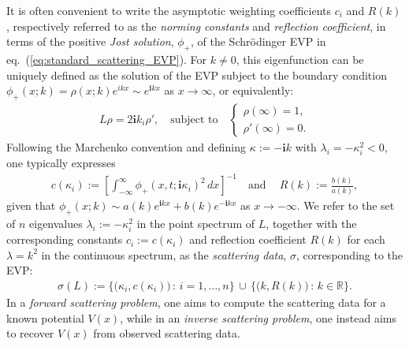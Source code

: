 \documentclass[journal=gmj]{CUP-JNL-DTM}%
\theoremstyle{definition}
\numberwithin{equation}{section}
\begin{document}
It is often convenient to write the asymptotic weighting coefficients $c_i$ and $R(k)$, respectively referred to as the \textit{norming constants} and \textit{reflection coefficient}, in terms of the positive \textit{Jost solution}, $\phi_{+}$, of the Schr\"odinger EVP in eq.~(\ref{eq:standard_scattering_EVP}). For $k \neq 0$, this eigenfunction can be uniquely defined as the solution of the EVP subject to the boundary condition $\phi_{+}(x;k) = \rho(x;k)e^{ikx} \sim e^{\boldsymbol{i}kx}$ as $x \rightarrow \infty$, or equivalently: \begin{align}\label{eq:jost_soln}
    L\rho = 2\boldsymbol{i}k_i\rho',
    \quad \text{subject to} \quad
    \begin{cases}
        \rho(\infty) = 1,
        \\
        \rho'(\infty) = 0.
    \end{cases}
\end{align} Following the Marchenko convention and defining $\kappa := -\boldsymbol{i}k$ with $\lambda_i = -\kappa^2_i < 0$, one typically expresses \begin{align}\label{eq:norming_constant}
    c(\kappa_i) := \left[ \int_{-\infty}^{\infty} \phi_{+}(x,t;\boldsymbol{i}\kappa_i)^2 \, dx \right]^{-1}\!
    \quad \text{and} \ \quad
    R(k) := \frac{b(k)}{a(k)},
\end{align} given that $\phi_+(x;k) \sim a(k)e^{\boldsymbol{i}kx} + b(k)e^{-\boldsymbol{i}kx}$ as $x \rightarrow -\infty$. We refer to the set of $n$ eigenvalues $\lambda_i := -\kappa^2_i$ in the point spectrum of $L$, together with the corresponding constants $c_i := c(\kappa_i)$ and reflection coefficient $R(k)$ for each $\lambda = k^2$ in the continuous spectrum, as the \textit{scattering data}, $\sigma$, corresponding to the EVP: \begin{align}\label{eq:scattering_data_def}
    \sigma(L) := \big\{\big(\kappa_i, c(\kappa_i)\big) \, : \, i=1, \dots,n\big\} \, \cup \, \big\{ \big(k, R(k)\big) \, : \, k \in \mathbb{R} \big\}.
\end{align} In a \textit{forward scattering problem}, one aims to compute the scattering data for a known potential $V(x)$, while in an \textit{inverse scattering problem}, one instead aims to recover $V(x)$ from observed scattering data.

\smallskip
\end{document}
